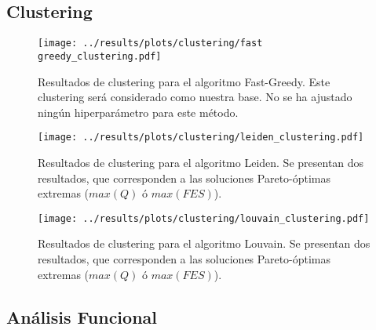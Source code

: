 \subsection{Clustering}

\begin{figure}[htbp]
	\centering
	\texttt{[image: ../results/plots/clustering/fast greedy\_clustering.pdf]}
	\caption{Resultados de clustering para el algoritmo Fast-Greedy. Este clustering será considerado como nuestra base. No se ha ajustado ningún hiperparámetro para este método.}
	\label{fig:fastgreedy_clustering}
\end{figure}

\begin{figure}[htbp]
	\centering
	\texttt{[image: ../results/plots/clustering/leiden\_clustering.pdf]}
	\caption{Resultados de clustering para el algoritmo Leiden. Se presentan dos resultados, que corresponden a las soluciones Pareto-óptimas extremas (\(max(Q)\) ó \(max(FES)\)).}
	\label{fig:leiden_clustering}
\end{figure}

\begin{figure}[htbp]
	\centering
	\texttt{[image: ../results/plots/clustering/louvain\_clustering.pdf]}
	\caption{Resultados de clustering para el algoritmo Louvain. Se presentan dos resultados, que corresponden a las soluciones Pareto-óptimas extremas (\(max(Q)\) ó \(max(FES)\)).}
	\label{fig:louvain_clustering}
\end{figure}

\subsection{Análisis Funcional}
